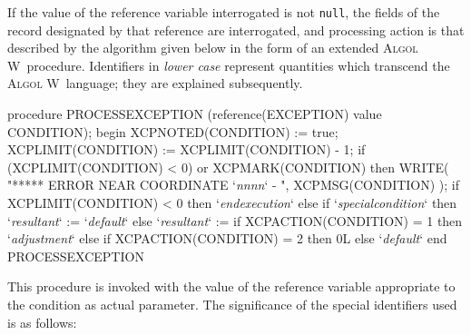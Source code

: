 \documentclass[a4paper]{article}
\def\ALGOLW{\textsc{Algol W}}
\def\R#1{\lstinline[language=AlgolW,style=ReferenceManual]{#1}}
\def\Transcendent#1{\textrm{\textit{\small #1}}}
\begin{document}
\newpage
If the value of the reference variable interrogated is not \R{null},
the fields of the record designated by that reference are
interrogated, and processing action is that described by the algorithm
given below in the form of an extended \ALGOLW\ procedure.  Identifiers
in \Transcendent{lower case} represent quantities which transcend the
\ALGOLW\ language; they are explained subsequently.

\begin{AlgolW}
procedure PROCESSEXCEPTION (reference(EXCEPTION) value CONDITION);
   begin
      XCPNOTED(CONDITION) := true;
      XCPLIMIT(CONDITION) := XCPLIMIT(CONDITION) - 1;
      if (XCPLIMIT(CONDITION) < 0) or XCPMARK(CONDITION) then
         WRITE( "***** ERROR NEAR COORDINATE `\Transcendent{nnnn}` - ", 
                 XCPMSG(CONDITION) );
      if XCPLIMIT(CONDITION) < 0 then `\Transcendent{endexecution}` else
      if `\Transcendent{specialcondition}` then
      `\Transcendent{resultant}` := `\Transcendent{default}` else
      `\Transcendent{resultant}` := if XCPACTION(CONDITION) = 1 then `\Transcendent{adjustment}`
                   else if XCPACTION(CONDITION) = 2 then 0L
                   else `\Transcendent{default}`
   end PROCESSEXCEPTION
\end{AlgolW}

This procedure is invoked with the value of the reference variable
appropriate to the condition as actual parameter. The significance of
the special identifiers used is as follows:
\end{document}
